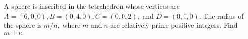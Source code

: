 A sphere is inscribed in the tetrahedron whose vertices are $A=(6,0,0), B=(0,4,0), C=(0,0,2),$ and $D=(0,0,0).$  The radius of the sphere is $m/n,$ where $m$ and $n$ are relatively prime positive integers.  Find $m+n.$